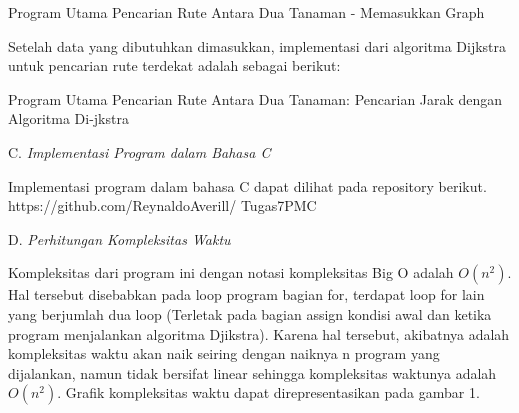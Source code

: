 \documentclass[conference]{IEEEtran}
\begin{document}
\begin{algorithm}
    \caption{Program Utama Pencarian Rute Antara Dua Tanaman -
    Memasukkan Graph}
\end{algorithm}

Setelah data yang dibutuhkan dimasukkan, implementasi
dari algoritma Dijkstra untuk pencarian rute terdekat adalah
sebagai berikut:

\begin{algorithm}
    \caption{Program Utama Pencarian Rute Antara Dua Tanaman: Pencarian
    Jarak dengan Algoritma Di-jkstra}
\end{algorithm}

C. \textit{Implementasi Program dalam Bahasa C}


Implementasi program dalam bahasa C dapat dilihat
pada repository berikut. https://github.com/ReynaldoAverill/
Tugas7PMC


D. \textit{Perhitungan Kompleksitas Waktu}


Kompleksitas dari program ini dengan notasi kompleksitas
Big O adalah $O(n^2)$. Hal tersebut disebabkan pada loop
program bagian for, terdapat loop for lain yang berjumlah
dua loop (Terletak pada bagian assign kondisi awal dan ketika
program menjalankan algoritma Djikstra). Karena hal tersebut,
akibatnya adalah kompleksitas waktu akan naik seiring dengan
naiknya n program yang dijalankan, namun tidak bersifat
linear sehingga kompleksitas waktunya adalah $O(n^2)$. Grafik
kompleksitas waktu dapat direpresentasikan pada gambar 1.





\end{document}
